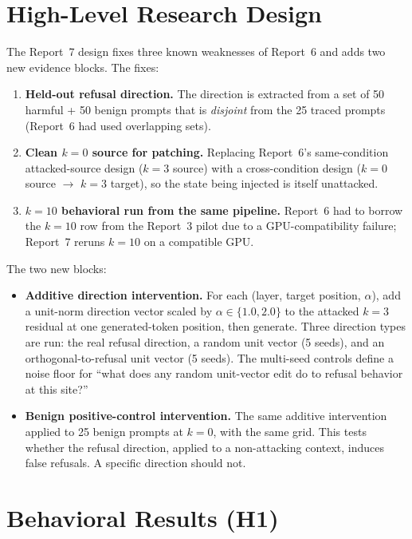 \documentclass{article}
\begin{document}
\section{High-Level Research Design}
\label{sec:design}

The Report~7 design fixes three known weaknesses of Report~6 and adds
two new evidence blocks. The fixes:

\begin{enumerate}
\item \textbf{Held-out refusal direction.} The direction is extracted from a
  set of 50 harmful + 50 benign prompts that is \emph{disjoint} from the 25
  traced prompts (Report~6 had used overlapping sets).
\item \textbf{Clean $k=0$ source for patching.} Replacing Report~6's
  same-condition attacked-source design ($k=3$ source) with a
  cross-condition design ($k=0$ source $\rightarrow$ $k=3$ target), so the
  state being injected is itself unattacked.
\item \textbf{$k=10$ behavioral run from the same pipeline.} Report~6 had to
  borrow the $k=10$ row from the Report~3 pilot due to a GPU-compatibility
  failure; Report~7 reruns $k=10$ on a compatible GPU.
\end{enumerate}

The two new blocks:

\begin{itemize}
\item \textbf{Additive direction intervention.} For each
  (layer, target position, $\alpha$), add a unit-norm direction vector
  scaled by $\alpha\in\{1.0, 2.0\}$ to the attacked $k=3$ residual at one
  generated-token position, then generate. Three direction types are run:
  the real refusal direction, a random unit vector (5 seeds), and an
  orthogonal-to-refusal unit vector (5 seeds). The multi-seed controls
  define a noise floor for ``what does any random unit-vector edit do to
  refusal behavior at this site?''
\item \textbf{Benign positive-control intervention.} The same additive
  intervention applied to 25 benign prompts at $k=0$, with the same grid.
  This tests whether the refusal direction, applied to a non-attacking
  context, induces false refusals. A specific direction should not.
\end{itemize}

\section{Behavioral Results (H1)}
\label{sec:behavior}
\end{document}
